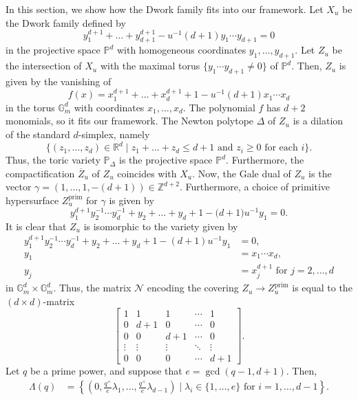 \documentclass[11pt, reqno]{amsart}
\theoremstyle{plain}
\theoremstyle{definition}
\newcommand{\Z}{\mathbb{Z}}
\newcommand{\Ps}{\mathbb{P}}
\newcommand{\R}{\mathbb{R}}
\newcommand{\ga}{\gamma}
\newcommand{\G}{\mathbb{G}}
\begin{document}
In this section, we show how the Dwork family fits into our framework.
Let $X_u$ be the Dwork family defined by
\[
y_1^{d+1}+\dots + y_{d+1}^{d+1} - u^{-1} (d+1) y_1 \cdots y_{d+1} = 0
\]
in the projective space $\Ps^d$ with homogeneous coordinates $y_1, \dots, y_{d+1}$.  Let $Z_u$ be the intersection of $X_u$ with the maximal torus $\{y_1\cdots y_{d+1} \neq 0\}$ of $\Ps^{d}$. Then, $Z_u$ is given by the vanishing of
\[
f(x)= x_1^{d+1}+\dots + x_{d}^{d+1} +1  - u^{-1} (d+1) x_1 \cdots x_{d}
\]
in the torus $\G_m^{d}$ with coordinates $x_1, \dots, x_{d}$. 
The polynomial $f$ has $d+2$ monomials, so it fits our framework.  The Newton polytope $\Delta$ of $Z_{u}$ is a dilation of the standard $d$-simplex, namely 
\[
\big\{(z_1,\dots ,z_d)\in \R^d \mid  z_1+\dots +z_d \le {d+1} \text{ and }z_i \ge 0 \text{ for each }i \big\}.
\]
Thus, the toric variety $\Ps_{\Delta}$ is the projective space $\Ps^{d}$. Furthermore, the compactification $\overline{Z}_u$ of $Z_{u}$ coincides with $X_u$. Now, the Gale dual of $Z_u$ is the vector $\ga= (1,\dots,1,-(d+1)) \in \Z^{d+2}$. Furthermore, a choice of primitive hypersurface $Z_u^{\operatorname{prim}}$ for $\ga$ is given by
\begin{equation}\label{eq:dwork2}
  y_1^{d+1}y_2^{-1}\cdots y_d^{-1}+y_2 + \dots +y_{d} + 1 -{(d+1}) u^{-1} y_1 =0.  
\end{equation}
It is clear that $Z_u$ is isomorphic to the variety given by
\begin{align*}
     y_1^{d+1}y_2^{-1}\cdots y_d^{-1}+y_2 + \dots +y_{d} + 1 -(d+1) u^{-1} y_1 &=0,\\
     y_1&= x_1\cdots x_d,\\
     y_j&= x_j^{d+1}  \text{ for } j =2,\dots, d
\end{align*}
in $\G_m^{d} \times \G_m^d$.
Thus, the matrix $\mathcal{N}$ encoding the covering $Z_u\to Z_u^{\operatorname{prim}}$ is equal to the $(d \times d)$-matrix
\[
\begin{bmatrix}
1 & 1 & 1& \cdots & 1 \\
0 & d+1 &0& \cdots & 0 \\
0 & 0 &d+1& \cdots & 0 \\
\vdots & \vdots & \vdots & \ddots & \vdots \\
0 & 0 & 0& \cdots & d+1
\end{bmatrix}.
\]
Let $q$ be a prime power, and suppose that $e=\gcd(q-1,d+1)$.
Then, 
\begin{align*}
    \Lambda(q) &= \left\{ \left(0, \frac{q^\times}{e} \lambda_1, \dots, \frac{q^\times}{e}\lambda_{d-1}\right) \mid \lambda_i \in \{1,\dots,e\} \text{ for } i=1, \dots,d-1\right\}.
\end{align*}
\end{document}
